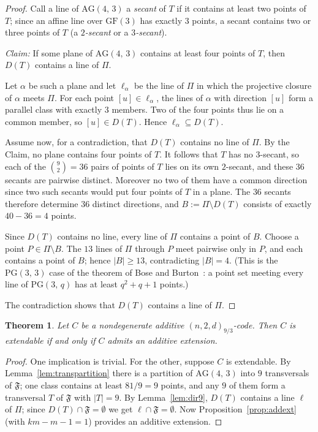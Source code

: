 \documentclass[12pt]{article}
\newtheorem{thm}{Theorem}[section]
\theoremstyle{definition}
\numberwithin{equation}{section}
\newcommand{\GF}[1]{\mathrm{GF}(#1)}
\newcommand{\PG}[2]{\mathrm{PG}(#1,\,#2)}
\newcommand{\AG}[2]{\mathrm{AG}(#1,\,#2)}
\newcommand{\Afold}{\mathfrak{F}}
\begin{document}
\begin{proof}
Call a line of $\AG{4}{3}$ a \textit{secant} of $T$ if it contains at least two points of $T$; since an affine line over $\GF{3}$ has exactly $3$ points, a secant contains two or three points of $T$ (a \textit{$2$-secant} or a \textit{$3$-secant}).

\smallskip
\noindent\textit{Claim:}  If some plane of $\AG{4}{3}$ contains at least four points of $T$, then $D(T)$ contains a line of $\Pi$.

Let $\alpha$ be such a plane and let $\ell_\alpha$ be the line of $\Pi$ in which the projective closure of $\alpha$ meets $\Pi$.  For each point $[u]\in\ell_\alpha$, the lines of $\alpha$ with direction $[u]$ form a parallel class with exactly $3$ members.  Two of the four points thus lie on a common member, so $[u]\in D(T)$.  Hence $\ell_\alpha\subseteq D(T)$.

\smallskip
\noindent Assume now, for a contradiction, that $D(T)$ contains no line of $\Pi$.  By the Claim, no plane contains four points of $T$.  It follows that $T$ has no $3$-secant, so each of the $\binom{9}{2}=36$ pairs of points of $T$ lies on its own $2$-secant, and these $36$ secants are pairwise distinct.  Moreover no two of them have a common direction since two such secants would put four points of $T$ in a plane.  The $36$ secants therefore determine $36$ distinct directions, and $B:=\Pi\setminus D(T)$ consists of exactly $40-36=4$ points.

\smallskip
Since $D(T)$ contains no line, every line of $\Pi$ contains a point of $B$.  Choose a point $P\in\Pi\setminus B$. The $13$ lines of $\Pi$ through $P$ meet pairwise only in $P$, and each contains a point of $B$; hence $|B|\geq13$, contradicting $|B|=4$. (This is the $\PG{3}{3}$ case of the theorem of Bose and Burton~\cite{BoseBurton}: a point set meeting every line of $\PG{3}{q}$ has at least $q^2+q+1$ points.)

The contradiction shows that $D(T)$ contains a line of $\Pi$.
\end{proof}

\begin{thm}\label{thm:93}
Let $C$ be a nondegenerate additive $(n,2,d)_{9/3}$-code.  Then $C$ is extendable if and only if $C$ admits an additive extension.
\end{thm}

\begin{proof}
One implication is trivial.  For the other, suppose $C$ is extendable. By Lemma~\ref{lem:transpartition} there is a partition of $\AG{4}{3}$ into $9$ transversals of $\Afold$; one class contains at least $81/9=9$ points, and any $9$ of them form a transversal $T$ of $\Afold$ with $|T|=9$.  By Lemma~\ref{lem:dir9}, $D(T)$ contains a line $\ell$ of $\Pi$; since $D(T)\cap\Afold=\emptyset$ we get $\ell\cap\Afold=\emptyset$.  Now Proposition~\ref{prop:addext} (with $km-m-1=1$) provides an additive extension. 
\end{proof}
\end{document}
